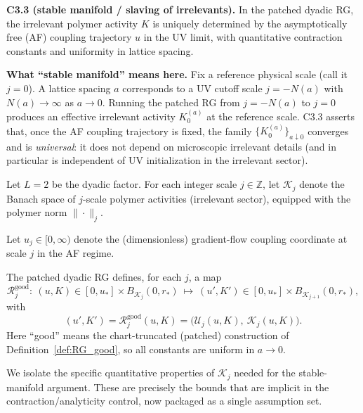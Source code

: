 \medskip
\noindent\textbf{C3.3 (stable manifold / slaving of irrelevants).}
In the patched dyadic RG, the irrelevant polymer activity $K$ is uniquely determined by the asymptotically free (AF) coupling trajectory $u$ in the UV limit,
with quantitative contraction constants and uniformity in lattice spacing.

\medskip
\noindent\textbf{What ``stable manifold'' means here.}
Fix a reference physical scale (call it $j=0$). A lattice spacing $a$ corresponds to a UV cutoff scale $j=-N(a)$ with $N(a)\to\infty$ as $a\to0$.
Running the patched RG from $j=-N(a)$ to $j=0$ produces an effective irrelevant activity $K^{(a)}_0$ at the reference scale.
C3.3 asserts that, once the AF coupling trajectory is fixed, the family $\{K^{(a)}_0\}_{a\downarrow0}$ converges and is \emph{universal}:
it does not depend on microscopic irrelevant details (and in particular is independent of UV initialization in the irrelevant sector).

Let $L=2$ be the dyadic factor. For each integer scale $j\in\mathbb Z$, let $\mathscr K_j$ denote the Banach space of $j$-scale polymer activities (irrelevant sector),
equipped with the polymer norm $\|\cdot\|_j$.

Let $u_j\in[0,\infty)$ denote the (dimensionless) gradient-flow coupling coordinate at scale $j$ in the AF regime.

The patched dyadic RG defines, for each $j$, a map
\[
\mathcal R^{\mathrm{good}}_j:\ (u,K)\in [0,u_\ast]\times B_{\mathscr K_j}(0,r_\ast)\ \longmapsto\ (u',K')\in [0,u_\ast]\times B_{\mathscr K_{j+1}}(0,r_\ast),
\]
with
\[
(u',K')=\mathcal R^{\mathrm{good}}_j(u,K)=\big(\mathcal U_j(u,K),\ \mathcal K_j(u,K)\big).
\]
Here ``good'' means the chart-truncated (patched) construction of Definition~\ref{def:RG_good}, so all constants are uniform in $a\to0$.

We isolate the specific quantitative properties of $\mathcal K_j$ needed for the stable-manifold argument.
These are precisely the bounds that are implicit in the contraction/analyticity control, now packaged as a single assumption set.


